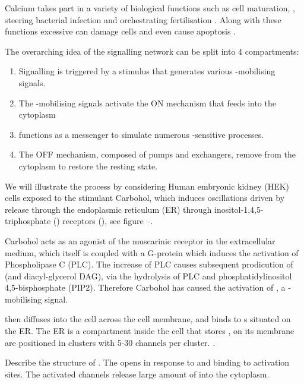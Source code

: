 \documentclass[../main.tex]{subfiles}
\begin{document}
 Calcium takes part in a variety of biological functions such as
 cell maturation, \cite{Tosti_2006},
 steering bacterial infection \cite{VanNhieu_2003} and 
 orchestrating fertilisation \cite{Santella_2004,Whitaker_2006,Denninger_2014}.
 Along with these functions excessive  can damage cells and even cause apoptosis \cite{Mattson_2003, Orrenius_2003}.
 
 The overarching idea of the  signalling network can be split into 4 compartments: 
 \begin{enumerate}
 \item Signalling is triggered by a stimulus that generates various -mobilising signals.
 \item The -mobilising signals activate the ON mechanism that feeds  into the cytoplasm
 \item {} functions as a messenger to simulate numerous -sensitive processes.
 \item The OFF mechanism, composed of pumps and exchangers, remove  from the cytoplasm to restore the resting state. 
 \end{enumerate}
 
 We will illustrate the process by considering Human embryonic kidney (HEK) cells exposed to the stimulant Carbohol, which induces  oscillations driven by  release through the endoplasmic reticulum (ER) through inositol-1,4,5-triphosphate () receptors (), see figure --. 
 
 Carbohol acts as an agonist of the muscarinic  receptor in the extracellular medium, which itself is coupled with a G-protein which induces the activation of Phospholipase C (PLC). The increase of PLC causes subsequent prodicution of  (and diacyl-glycerol DAG), via the hydrolysis of PLC and phosphatidylinositol 4,5-bisphosphate (PIP2). Therefore Carbohol has caused the activation of , a -mobilising signal. 
 
 then diffuses into the cell across the cell membrane, and binds to s situated on the ER. The ER is a compartment inside the cell that stores , on its membrane  are positioned in clusters with 5-30  channels per cluster. \cite{Swillens_1999}.

Describe the structure of . The  opens in response to  and  binding to activation sites. The activated channels release large amount of  into the cytoplasm. 
\end{document}
